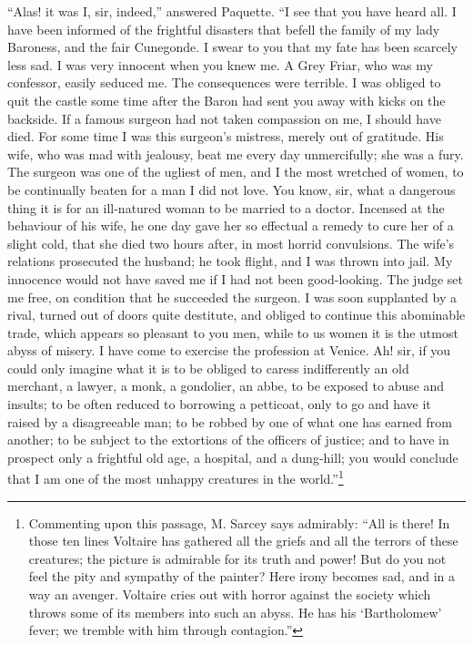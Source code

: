 ``Alas! it was I, sir, indeed,'' answered Paquette. ``I see that you have heard all. I have been informed of the frightful disasters that befell the family of my lady Baroness, and the fair Cunegonde. I swear to you that my fate has been scarcely less sad. I was very innocent when you knew me. A Grey Friar, who was my confessor, easily seduced me. The consequences were terrible. I was obliged to quit the castle some time after the Baron had sent you away with kicks on the backside. If a famous surgeon had not taken compassion on me, I should have died. For some time I was this surgeon's mistress, merely out of gratitude. His wife, who was mad with jealousy, beat me every day unmercifully; she was a fury. The surgeon was one of the ugliest of men, and I the most wretched of women, to be continually beaten for a man I did not love. You know, sir, what a dangerous thing it is for an ill-natured woman to be married to a doctor. Incensed at the behaviour of his wife, he one day gave her so effectual a remedy to cure her of a slight cold, that she died two hours after, in most horrid convulsions. The wife's relations prosecuted the husband; he took flight, and I was thrown into jail. My innocence would not have saved me if I had not been good-looking. The judge set me free, on condition that he succeeded the surgeon. I was soon supplanted by a rival, turned out of doors quite destitute, and obliged to continue this abominable trade, which appears so pleasant to you men, while to us women it is the utmost abyss of misery. I have come to exercise the profession at Venice. Ah! sir, if you could only imagine what it is to be obliged to caress indifferently an old merchant, a lawyer, a monk, a gondolier, an abbe, to be exposed to abuse and insults; to be often reduced to borrowing a petticoat, only to go and have it raised by a disagreeable man; to be robbed by one of what one has earned from another; to be subject to the extortions of the officers of justice; and to have in prospect only a frightful old age, a hospital, and a dung-hill; you would conclude that I am one of the most unhappy creatures in the world.''\footnote{Commenting upon this passage, M. Sarcey says admirably: ``All is there! In those ten lines Voltaire has gathered all the griefs and all the terrors of these creatures; the picture is admirable for its truth and power! But do you not feel the pity and sympathy of the painter? Here irony becomes sad, and in a way an avenger. Voltaire cries out with horror against the society which throws some of its members into such an abyss. He has his `Bartholomew' fever; we tremble with him through contagion.''}

